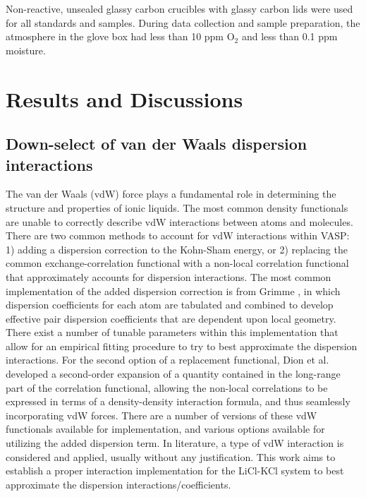 \documentclass[review]{elsarticle}
\begin{document}
Non-reactive, unsealed glassy carbon crucibles with glassy carbon lids were used for all standards and samples. During data collection and sample preparation, the atmosphere in the glove box had less than 10 ppm O$_2$ and less than 0.1 ppm moisture. 


\FloatBarrier

\section{Results and Discussions}

\subsection{Down-select of van der Waals dispersion interactions}

The van der Waals (vdW) force plays a fundamental role in determining the structure and properties of ionic liquids. The most common density functionals are unable to correctly describe vdW interactions between atoms and molecules.  There are two common methods to account for vdW interactions within VASP: 1) adding a dispersion correction to the Kohn-Sham energy, or 2) replacing the common exchange-correlation functional with a non-local correlation functional that approximately accounts for dispersion interactions. The most common implementation of the added dispersion correction is from Grimme \cite{Grimme2006,Grimme2010}, in which dispersion coefficients for each atom are tabulated and combined to develop effective pair dispersion coefficients that are dependent upon local geometry. There exist a number of tunable parameters within this implementation that allow for an empirical fitting procedure to try to best approximate the dispersion interactions. For the second option of a replacement functional, Dion et al.\cite{Dion2004} developed a second-order expansion of a quantity contained in the long-range part of the correlation functional, allowing the non-local correlations to be expressed in terms of a density-density interaction formula, and thus seamlessly incorporating vdW forces. There are a number of versions of these vdW functionals available for implementation, and various options available for utilizing the added dispersion term. In literature, a type of vdW interaction is considered and applied, usually without any justification. This work aims to establish a proper interaction implementation for the LiCl-KCl system to best approximate the dispersion interactions/coefficients. 
\end{document}
